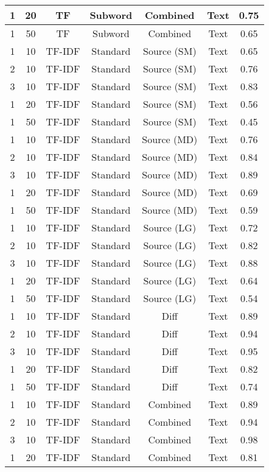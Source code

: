 \begin{longtable}{|c|c|c|c|c|c|c|}
\hline
1 & 20 & TF & Subword & Combined & Text & 0.75 \\
\hline
1 & 50 & TF & Subword & Combined & Text & 0.65 \\
\hline
1 & 10 & TF-IDF & Standard & Source (SM) & Text & 0.65 \\
\hline
2 & 10 & TF-IDF & Standard & Source (SM) & Text & 0.76 \\
\hline
3 & 10 & TF-IDF & Standard & Source (SM) & Text & 0.83 \\
\hline
1 & 20 & TF-IDF & Standard & Source (SM) & Text & 0.56 \\
\hline
1 & 50 & TF-IDF & Standard & Source (SM) & Text & 0.45 \\
\hline
1 & 10 & TF-IDF & Standard & Source (MD) & Text & 0.76 \\
\hline
2 & 10 & TF-IDF & Standard & Source (MD) & Text & 0.84 \\
\hline
3 & 10 & TF-IDF & Standard & Source (MD) & Text & 0.89 \\
\hline
1 & 20 & TF-IDF & Standard & Source (MD) & Text & 0.69 \\
\hline
1 & 50 & TF-IDF & Standard & Source (MD) & Text & 0.59 \\
\hline
1 & 10 & TF-IDF & Standard & Source (LG) & Text & 0.72 \\
\hline
2 & 10 & TF-IDF & Standard & Source (LG) & Text & 0.82 \\
\hline
3 & 10 & TF-IDF & Standard & Source (LG) & Text & 0.88 \\
\hline
1 & 20 & TF-IDF & Standard & Source (LG) & Text & 0.64 \\
\hline
1 & 50 & TF-IDF & Standard & Source (LG) & Text & 0.54 \\
\hline
1 & 10 & TF-IDF & Standard & Diff & Text & 0.89 \\
\hline
2 & 10 & TF-IDF & Standard & Diff & Text & 0.94 \\
\hline
3 & 10 & TF-IDF & Standard & Diff & Text & 0.95 \\
\hline
1 & 20 & TF-IDF & Standard & Diff & Text & 0.82 \\
\hline
1 & 50 & TF-IDF & Standard & Diff & Text & 0.74 \\
\hline
1 & 10 & TF-IDF & Standard & Combined & Text & 0.89 \\
\hline
2 & 10 & TF-IDF & Standard & Combined & Text & 0.94 \\
\hline
3 & 10 & TF-IDF & Standard & Combined & Text & 0.98 \\
\hline
1 & 20 & TF-IDF & Standard & Combined & Text & 0.81 \\

\end{longtable}
